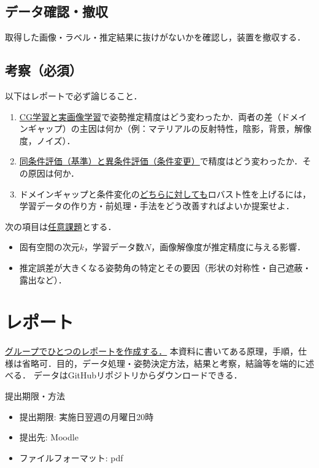 \documentclass{article}
\begin{document}
\subsection{データ確認・撤収}
取得した画像・ラベル・推定結果に抜けがないかを確認し，装置を撤収する．

\subsection*{考察（必須）}
以下はレポートで必ず論じること．
\begin{enumerate}
\item \uline{CG学習と実画像学習}で姿勢推定精度はどう変わったか．両者の差（ドメインギャップ）の主因は何か（例：マテリアルの反射特性，陰影，背景，解像度，ノイズ）．
\item \uline{同条件評価（基準）と異条件評価（条件変更）}で精度はどう変わったか．その原因は何か．
\item ドメインギャップと条件変化の\uline{どちらに対しても}ロバスト性を上げるには，学習データの作り方・前処理・手法をどう改善すればよいか提案せよ．
\end{enumerate}

\noindent 次の項目は\uline{任意課題}とする．
\begin{itemize}
\item 固有空間の次元$k$，学習データ数$N$，画像解像度が推定精度に与える影響．
\item 推定誤差が大きくなる姿勢角の特定とその要因（形状の対称性・自己遮蔽・露出など）．
\end{itemize}

\vspace{\baselineskip}

\section{レポート}
\uline{グループでひとつのレポートを作成する．}
本資料に書いてある原理，手順，仕様は省略可．目的，データ処理・姿勢決定方法，結果と考察，結論等を端的に述べる．
データはGitHubリポジトリからダウンロードできる．

提出期限・方法
\begin{itemize}
    \item 提出期限: 実施日翌週の月曜日20時
    \item 提出先: Moodle
    \item ファイルフォーマット: pdf    
\end{itemize}
\end{document}
